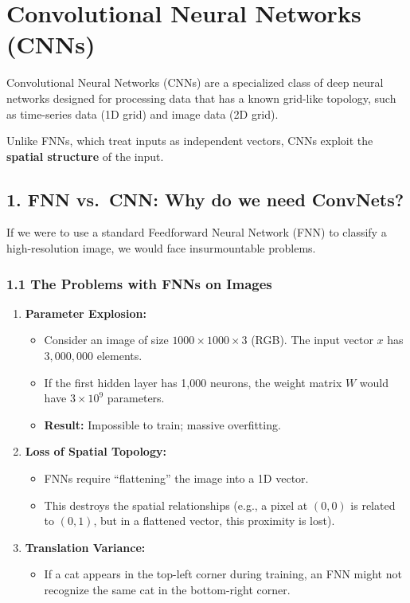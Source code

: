 \documentclass[
  italian,
  11pt,
]{article}
\providecommand{\tightlist}{%
  \setlength{\itemsep}{0pt}\setlength{\parskip}{0pt}}
\begin{document}
\section{Convolutional Neural Networks
(CNNs)}\label{convolutional-neural-networks-cnns}

Convolutional Neural Networks (CNNs) are a specialized class of deep
neural networks designed for processing data that has a known grid-like
topology, such as time-series data (1D grid) and image data (2D grid).

Unlike FNNs, which treat inputs as independent vectors, CNNs exploit the
\textbf{spatial structure} of the input.

\subsection{1. FNN vs.~CNN: Why do we need
ConvNets?}\label{fnn-vs.-cnn-why-do-we-need-convnets}

If we were to use a standard Feedforward Neural Network (FNN) to
classify a high-resolution image, we would face insurmountable problems.

\subsubsection{1.1 The Problems with FNNs on
Images}\label{the-problems-with-fnns-on-images}

\begin{enumerate}
\def\labelenumi{\arabic{enumi}.}
\item
  \textbf{Parameter Explosion:}

  \begin{itemize}
  \item
    Consider an image of size \(1000 \times 1000 \times 3\) (RGB). The
    input vector \(x\) has \(3,000,000\) elements.
  \item
    If the first hidden layer has 1,000 neurons, the weight matrix \(W\)
    would have \(3 \times 10^9\) parameters.
  \item
    \textbf{Result:} Impossible to train; massive overfitting.
  \end{itemize}
\item
  \textbf{Loss of Spatial Topology:}

  \begin{itemize}
  \item
    FNNs require ``flattening'' the image into a 1D vector.
  \item
    This destroys the spatial relationships (e.g., a pixel at \((0,0)\)
    is related to \((0,1)\), but in a flattened vector, this proximity
    is lost).
  \end{itemize}
\item
  \textbf{Translation Variance:}

  \begin{itemize}
  \tightlist
  \item
    If a cat appears in the top-left corner during training, an FNN
    might not recognize the same cat in the bottom-right corner.
  \end{itemize}
\end{enumerate}
\end{document}
